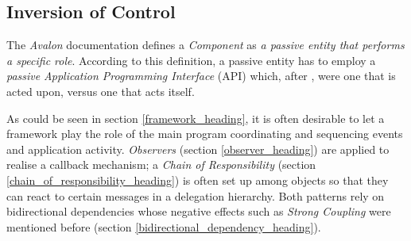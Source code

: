 %
%
%
%
%
%
%

\subsection{Inversion of Control}
\label{inversion_of_control_heading}

The \emph{Avalon} documentation \cite{avalon} defines a \emph{Component} as
\emph{a passive entity that performs a specific role}. According to this
definition, a passive entity has to employ a \emph{passive}
\emph{Application Programming Interface} (API) which, after \cite{avalon}, were
one that is acted upon, versus one that acts itself.

As could be seen in section \ref{framework_heading}, it is often desirable to
let a framework play the role of the main program coordinating and sequencing
events and application activity. \emph{Observers} (section \ref{observer_heading})
are applied to realise a callback mechanism; a \emph{Chain of Responsibility}
(section \ref{chain_of_responsibility_heading}) is often set up among objects
so that they can react to certain messages in a delegation hierarchy. Both
patterns rely on bidirectional dependencies whose negative effects such as
\emph{Strong Coupling} were mentioned before (section
\ref{bidirectional_dependency_heading}).

